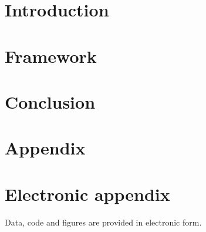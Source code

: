 \documentclass[12pt]{article}
\begin{document}
	\newpage
	\tableofcontents
	
	\newpage
	
	
	
	\section{Introduction}
	\label{intro}
	
	\newpage
	\section{Framework}
	\label{framework}
	
	\newpage
	\section{Conclusion}
	\label{conclusion}
	
	
	\newpage
	
	
	
	\setcounter{page}{5} %
	
	\appendix
	
	\section{Appendix}
	\label{app}
	
	\newpage
	
	\section{Electronic appendix}
	\label{el_app}
	
	Data, code and figures are provided in electronic form.
	
	\newpage
	
	
\end{document}
